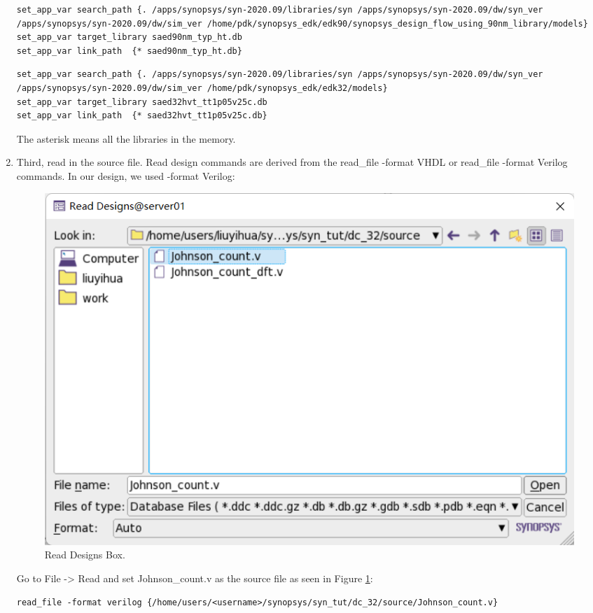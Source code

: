 \documentclass[a4paper,12pt,twoside]{article}
\begin{document}
\begin{enumerate}
\begin{itemize}
    \end{itemize}
    \begin{verbatim}
set_app_var search_path {. /apps/synopsys/syn-2020.09/libraries/syn /apps/synopsys/syn-2020.09/dw/syn_ver /apps/synopsys/syn-2020.09/dw/sim_ver /home/pdk/synopsys_edk/edk90/synopsys_design_flow_using_90nm_library/models}
set_app_var target_library saed90nm_typ_ht.db
set_app_var link_path  {* saed90nm_typ_ht.db}
    \end{verbatim}
    \begin{verbatim}
set_app_var search_path {. /apps/synopsys/syn-2020.09/libraries/syn /apps/synopsys/syn-2020.09/dw/syn_ver /apps/synopsys/syn-2020.09/dw/sim_ver /home/pdk/synopsys_edk/edk32/models}
set_app_var target_library saed32hvt_tt1p05v25c.db
set_app_var link_path  {* saed32hvt_tt1p05v25c.db}
    \end{verbatim}
    The asterisk means all the libraries in the memory.
    \item Third, read in the source file. Read design commands are derived from the read\_file -format VHDL or read\_file -format Verilog commands. In our design, we used -format Verilog:
    \begin{figure}[H]
        \centering
        \includegraphics[width=\textwidth]{images/19.png}
        \caption{Read Designs Box.}
        \label{f19}
    \end{figure}
    Go to File -> Read and set Johnson\_count.v as the source file as seen in Figure \ref{f19}:
    \begin{verbatim}
read_file -format verilog {/home/users/<username>/synopsys/syn_tut/dc_32/source/Johnson_count.v}

\end{verbatim}
\end{enumerate}
\end{document}
